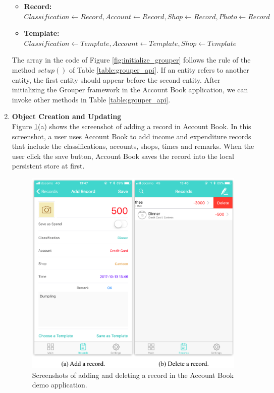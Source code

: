 \documentclass[a4paper,11pt]{report}
\begin{document}
\begin{enumerate}
\begin{itemize}
	\setlength{\itemsep}{1pt}
	\setlength{\parskip}{0pt}
	\setlength{\parsep}{0pt}
	\item \textbf{Record:}
	$Classification \gets Record, Account \gets Record, Shop \gets Record, Photo \gets Record$
	\item \textbf{Template:} 
	$Classification \gets Template, Account \gets Template, Shop \gets Template$
\end{itemize}

The array in the code of Figure \ref{fig:initialize_grouper} follows the rule of the method $setup()$ of Table \ref{table:grouper_api}.
If an entity refers to another entity, the first entity should appear before the second entity.
After initializing the Grouper framework in the Account Book application, we can invoke other methods in Table \ref{table:grouper_api}.
\\

\item \textbf{Object Creation and Updating} \\	

Figure \ref{fig:add_delete_record}(a) shows the screenshot of adding a record in Account Book. 
In this screenshot, a user uses Account Book to add income and expenditure records that include the classifications, accounts, shops, times and remarks. 
When the user click the save button, Account Book saves the record into the local persistent store at first.

\begin{figure}[t]
	\centering
	\includegraphics[scale=0.62]{account_book}
	\caption{Screenshots of adding and deleting a record in the Account Book demo application.}
	\label{fig:add_delete_record}
\end{figure}


\end{enumerate}
\end{document}
